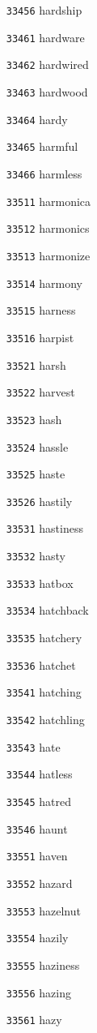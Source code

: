 \documentclass[twoside,11pt]{article}
\begin{document}
\begin{multicols}{5}
\begin{enumerate}
\item[\texttt{33456}] hardship
\item[\texttt{33461}] hardware
\item[\texttt{33462}] hardwired
\item[\texttt{33463}] hardwood
\item[\texttt{33464}] hardy
\item[\texttt{33465}] harmful
\item[\texttt{33466}] harmless
\item[\texttt{33511}] harmonica
\item[\texttt{33512}] harmonics
\item[\texttt{33513}] harmonize
\item[\texttt{33514}] harmony
\item[\texttt{33515}] harness
\item[\texttt{33516}] harpist
\item[\texttt{33521}] harsh
\item[\texttt{33522}] harvest
\item[\texttt{33523}] hash
\item[\texttt{33524}] hassle
\item[\texttt{33525}] haste
\item[\texttt{33526}] hastily
\item[\texttt{33531}] hastiness
\item[\texttt{33532}] hasty
\item[\texttt{33533}] hatbox
\item[\texttt{33534}] hatchback
\item[\texttt{33535}] hatchery
\item[\texttt{33536}] hatchet
\item[\texttt{33541}] hatching
\item[\texttt{33542}] hatchling
\item[\texttt{33543}] hate
\item[\texttt{33544}] hatless
\item[\texttt{33545}] hatred
\item[\texttt{33546}] haunt
\item[\texttt{33551}] haven
\item[\texttt{33552}] hazard
\item[\texttt{33553}] hazelnut
\item[\texttt{33554}] hazily
\item[\texttt{33555}] haziness
\item[\texttt{33556}] hazing
\item[\texttt{33561}] hazy

\end{enumerate}
\end{multicols}
\end{document}
